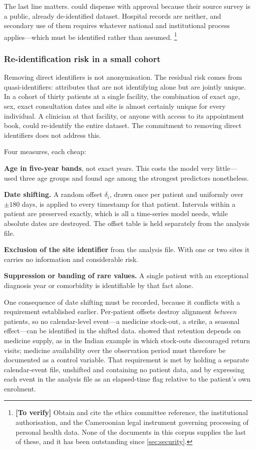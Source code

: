\documentclass[12pt,a4paper,oneside]{report}
\newcommand{\verify}[1]{\footnote{\textbf{[To verify]} #1}}
\begin{document}
The last line matters. \Textcite{mendoza2025} could dispense with approval because their source survey is a public, already de-identified dataset. Hospital records are neither, and secondary use of them requires whatever national and institutional process applies---which must be identified rather than assumed.%
\verify{Obtain and cite the ethics committee reference, the institutional authorisation, and the Cameroonian legal instrument governing processing of personal health data. None of the documents in this corpus supplies the last of these, and it has been outstanding since \cref{sec:security}.}

\subsubsection{Re-identification risk in a small cohort}\label{sec:reident}

Removing direct identifiers is not anonymisation. The residual risk comes from quasi-identifiers: attributes that are not identifying alone but are jointly unique. In a cohort of thirty patients at a single facility, the combination of exact age, sex, exact consultation dates and site is almost certainly unique for every individual. A clinician at that facility, or anyone with access to its appointment book, could re-identify the entire dataset. The commitment to removing direct identifiers does not address this.

Four measures, each cheap:

\textbf{Age in five-year bands}, not exact years. This costs the model very little---\textcite{mendoza2025} used three age groups and found age among the strongest predictors nonetheless.

\textbf{Date shifting.} A random offset $\delta_i$, drawn once per patient and uniformly over $\pm 180$ days, is applied to every timestamp for that patient. Intervals within a patient are preserved exactly, which is all a time-series model needs, while absolute dates are destroyed. The offset table is held separately from the analysis file.

\textbf{Exclusion of the site identifier} from the analysis file. With one or two sites it carries no information and considerable risk.

\textbf{Suppression or banding of rare values.} A single patient with an exceptional diagnosis year or comorbidity is identifiable by that fact alone.

One consequence of date shifting must be recorded, because it conflicts with a requirement established earlier. Per-patient offsets destroy alignment \emph{between} patients, so no calendar-level event---a medicine stock-out, a strike, a seasonal effect---can be identified in the shifted data.  showed that retention depends on medicine supply, as in the Indian example in which stock-outs discouraged return visits; medicine availability over the observation period must therefore be documented as a control variable. That requirement is met by holding a separate calendar-event file, unshifted and containing no patient data, and by expressing each event in the analysis file as an elapsed-time flag relative to the patient's own enrolment.
\end{document}
